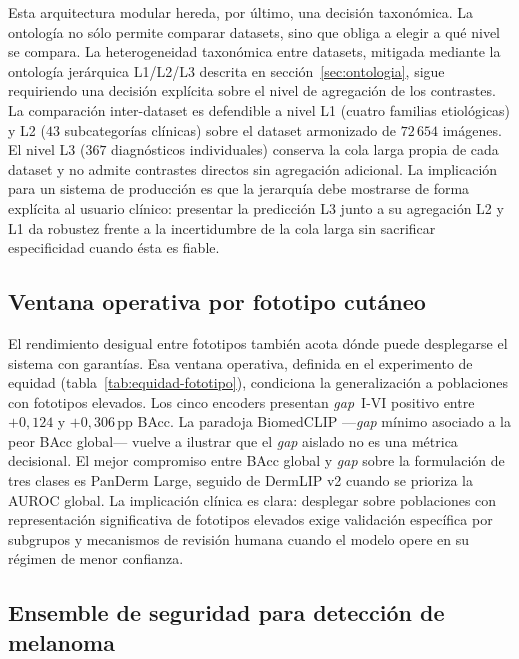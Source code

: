 Esta arquitectura modular hereda, por último, una decisión
taxonómica. La ontología no sólo permite comparar datasets, sino que
obliga a elegir a qué nivel se compara. La heterogeneidad taxonómica entre
datasets, mitigada mediante la ontología jerárquica L1/L2/L3 descrita
en sección~\ref{sec:ontologia}, sigue requiriendo una decisión
explícita sobre el nivel de agregación de los contrastes. La
comparación inter-dataset es defendible a nivel L1 (cuatro familias
etiológicas) y L2 ($43$ subcategorías clínicas) sobre el dataset
armonizado de $72\,654$ imágenes. El nivel L3 ($367$
diagnósticos individuales) conserva la cola larga propia de cada
dataset y no admite contrastes directos sin agregación adicional. La
implicación para un sistema de producción es que la jerarquía debe
mostrarse de forma explícita al usuario clínico: presentar la
predicción L3 junto a su agregación L2 y L1 da robustez frente a la
incertidumbre de la cola larga sin sacrificar especificidad cuando
ésta es fiable.

\subsection{Ventana operativa por fototipo cutáneo}
\label{sec:disc-ventana}

El rendimiento desigual entre fototipos también acota dónde puede
desplegarse el sistema con garantías. Esa ventana operativa, definida
en el experimento de equidad (tabla~\ref{tab:equidad-fototipo}),
condiciona la generalización a poblaciones con fototipos elevados.
Los cinco encoders presentan \emph{gap}~I-VI positivo entre
$+0{,}124$ y $+0{,}306$\,pp BAcc. La paradoja BiomedCLIP
---\emph{gap} mínimo asociado a la peor BAcc global--- vuelve a
ilustrar que el \emph{gap} aislado no es una métrica decisional. El
mejor compromiso entre BAcc global y \emph{gap} sobre la formulación
de tres clases es PanDerm Large, seguido de DermLIP v2 cuando se
prioriza la AUROC global. La implicación clínica es clara: desplegar
sobre poblaciones con representación significativa de fototipos
elevados exige validación específica por subgrupos y mecanismos de
revisión humana cuando el modelo opere en su régimen de menor
confianza.

\subsection{Ensemble de seguridad para detección de melanoma}
\label{sec:disc-ensemble}

